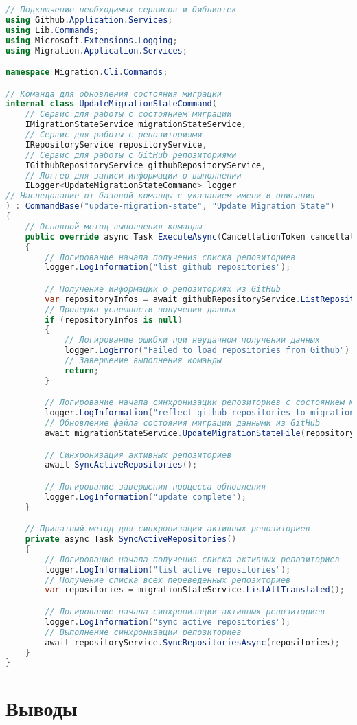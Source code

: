 \begin{lstlisting}[language=c#,label={lst:update-migration-state-command},caption={Код команды обновления информации о репозиториях}]
// Подключение необходимых сервисов и библиотек
using Github.Application.Services;
using Lib.Commands;
using Microsoft.Extensions.Logging;
using Migration.Application.Services;

namespace Migration.Cli.Commands;

// Команда для обновления состояния миграции
internal class UpdateMigrationStateCommand(
    // Сервис для работы с состоянием миграции
    IMigrationStateService migrationStateService,
    // Сервис для работы с репозиториями
    IRepositoryService repositoryService,
    // Сервис для работы с GitHub репозиториями
    IGithubRepositoryService githubRepositoryService,
    // Логгер для записи информации о выполнении
    ILogger<UpdateMigrationStateCommand> logger
// Наследование от базовой команды с указанием имени и описания
) : CommandBase("update-migration-state", "Update Migration State")
{
    // Основной метод выполнения команды
    public override async Task ExecuteAsync(CancellationToken cancellationToken)
    {
        // Логирование начала получения списка репозиториев
        logger.LogInformation("list github repositories");

        // Получение информации о репозиториях из GitHub
        var repositoryInfos = await githubRepositoryService.ListRepositoriesAsync();
        // Проверка успешности получения данных
        if (repositoryInfos is null)
        {
            // Логирование ошибки при неудачном получении данных
            logger.LogError("Failed to load repositories from Github");
            // Завершение выполнения команды
            return;
        }

        // Логирование начала синхронизации репозиториев с состоянием миграции
        logger.LogInformation("reflect github repositories to migration state");
        // Обновление файла состояния миграции данными из GitHub
        await migrationStateService.UpdateMigrationStateFile(repositoryInfos);

        // Синхронизация активных репозиториев
        await SyncActiveRepositories();

        // Логирование завершения процесса обновления
        logger.LogInformation("update complete");
    }

    // Приватный метод для синхронизации активных репозиториев
    private async Task SyncActiveRepositories()
    {
        // Логирование начала получения списка активных репозиториев
        logger.LogInformation("list active repositories");
        // Получение списка всех переведенных репозиториев
        var repositories = migrationStateService.ListAllTranslated();

        // Логирование начала синхронизации активных репозиториев
        logger.LogInformation("sync active repositories");
        // Выполнение синхронизации репозиториев
        await repositoryService.SyncRepositoriesAsync(repositories);
    }
}
\end{lstlisting}

\section{Выводы} \label{sec:conclusion}
